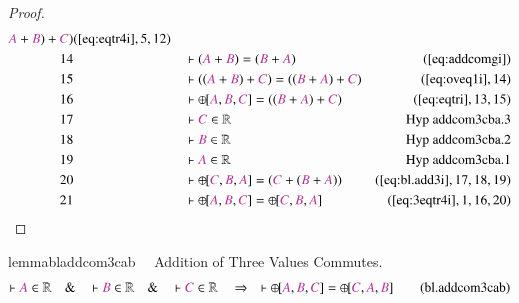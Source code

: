 \begin{proof}
\begin{align}
      \mc{A} + \mc{B} ) + \mc{C}
      )&(\mbox{\ref{eq:eqtr4i}},5,12)\notag
  \\ 14 &&  & \vdash ( \mc{A} + \mc{B} ) = ( \mc{B} + \mc{A}
      )&(\mbox{\ref{eq:addcomgi}})\notag
  \\ 15 &&  & \vdash ( ( \mc{A} + \mc{B} ) + \mc{C} ) = ( ( \mc{B} + \mc{A} ) +
      \mc{C} )&(\mbox{\ref{eq:oveq1i}},14)\notag
  \\ 16 &&  & \vdash {\oplus\hspace{-1pt}[} \mc{A} , \mc{B} , \mc{C} ] = ( (
      \mc{B} + \mc{A} ) + \mc{C}
      )&(\mbox{\ref{eq:eqtri}},13,15)\notag
  \\ 17 &&  & \vdash \mc{C} \in
\mathbb{R}&\text{Hyp~addcom3cba.3}\notag%
  \\ 18 &&  & \vdash \mc{B} \in
\mathbb{R}&\text{Hyp~addcom3cba.2}\notag%
  \\ 19 &&  & \vdash \mc{A} \in
\mathbb{R}&\text{Hyp~addcom3cba.1}\notag%
  \\ 20 &&  & \vdash {\oplus\hspace{-1pt}[} \mc{C} , \mc{B} , \mc{A} ] = (
      \mc{C} + ( \mc{B} + \mc{A} )
      )&(\mbox{\ref{eq:bl.add3i}},17,18,19)\notag
  \\ 21 &&  & \vdash {\oplus\hspace{-1pt}[} \mc{A} , \mc{B} , \mc{C} ] =
      {\oplus\hspace{-1pt}[} \mc{C} , \mc{B} , \mc{A}
      ]&(\mbox{\ref{eq:3eqtr4i}},1,16,20)\notag
\end{align}
\end{proof}

\begin{restatable}{lemma}{bladdcom3cab}~~ Addition of Three Values Commutes.
\begin{align}
\vdash \mc{A} \in \mathbb{R}\quad\&\quad \vdash \mc{B} \in
    \mathbb{R}\quad\&\quad \vdash \mc{C} \in \mathbb{R}\quad\Rightarrow\quad
    \vdash {\oplus\hspace{-1pt}[} \mc{A} , \mc{B} , \mc{C} ] =
    {\oplus\hspace{-1pt}[} \mc{C} , \mc{A} , \mc{B}
    ]\label{eq:bl.addcom3cab}\tag{bl.addcom3cab}
\end{align}
\end{restatable}

